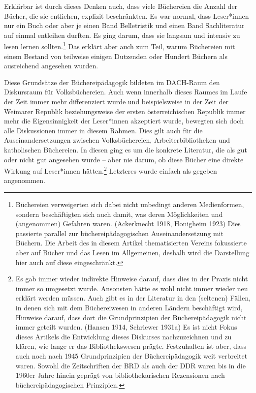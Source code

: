 \documentclass[a4paper,
fontsize=11pt,
oneside,
numbers=noperiodatend,
parskip=half-,
bibliography=totoc,
final
]{scrartcl}
\begin{document}
Erklärbar ist durch dieses Denken auch, dass viele Büchereien die Anzahl
der Bücher, die sie entliehen, explizit beschränkten. Es war normal,
dass Leser*innen nur ein Buch oder aber je einen Band Belletristik und
einen Band Sachliteratur auf einmal entleihen durften. Es ging darum,
dass sie langsam und intensiv zu lesen lernen sollten.\footnote{Büchereien
  verweigerten sich dabei nicht unbedingt anderen Medienformen, sondern
  beschäftigten sich auch damit, was deren Möglichkeiten und
  (angenommen) Gefahren waren. (Ackerknecht 1918, Honigheim 1923) Dies
  passierte parallel zur büchereipädagogischen Auseinandersetzung mit
  Büchern. Die Arbeit des in diesem Artikel thematisierten Vereins
  fokussierte aber auf Bücher und das Lesen im Allgemeinen, deshalb wird
  die Darstellung hier auch auf diese eingeschränkt.} Das erklärt aber
auch zum Teil, warum Büchereien mit einem Bestand von teilweise einigen
Dutzenden oder Hundert Büchern als ausreichend angesehen wurden.

Diese Grundsätze der Büchereipädagogik bildeten im DACH-Raum den
Diskursraum für Volksbüchereien. Auch wenn innerhalb dieses Raumes im
Laufe der Zeit immer mehr differenziert wurde und beispielsweise in der
Zeit der Weimarer Republik beziehungsweise der ersten österreichischen
Republik immer mehr die Eigensinnigkeit der Leser*innen akzeptiert
wurde, bewegten sich doch alle Diskussionen immer in diesem Rahmen. Dies
gilt auch für die Auseinandersetzungen zwischen Volksbüchereien,
Arbeiterbibliotheken und katholischen Büchereien. In diesen ging es um
die konkrete Literatur, die als gut oder nicht gut angesehen wurde --
aber nie darum, ob diese Bücher eine direkte Wirkung auf Leser*innen
hätten.\footnote{Es gab immer wieder indirekte Hinweise darauf, dass
  dies in der Praxis nicht immer so umgesetzt wurde. Ansonsten hätte es
  wohl nicht immer wieder neu erklärt werden müssen. Auch gibt es in der
  Literatur in den (seltenen) Fällen, in denen sich mit dem
  Büchereiwesen in anderen Ländern beschäftigt wird, Hinweise darauf,
  dass dort die Grundprinzipien der Büchereipädagogik nicht immer
  geteilt wurden. (Hansen 1914, Schriewer 1931a) Es ist nicht Fokus
  dieses Artikels die Entwicklung dieses Diskurses nachzuzeichnen und zu
  klären, wie lange er das Bibliothekswesen prägte. Festzuhalten ist
  aber, dass auch noch nach 1945 Grundprinzipien der Büchereipädagogik
  weit verbreitet waren. Sowohl die Zeitschriften der BRD als auch der
  DDR waren bis in die 1960er Jahre hinein geprägt von
  bibliothekarischen Rezensionen nach büchereipädagogischen Prinzipien.}
Letzteres wurde einfach als gegeben angenommen.
\end{document}
